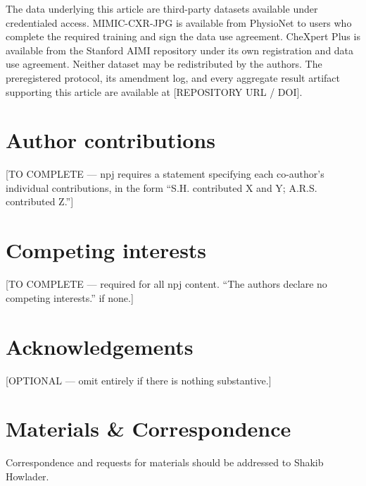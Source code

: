 \documentclass[11pt,a4paper]{article}
\begin{document}
The data underlying this article are third-party datasets available under
credentialed access. MIMIC-CXR-JPG is available from PhysioNet to users who
complete the required training and sign the data use agreement. CheXpert Plus
is available from the Stanford AIMI repository under its own registration and
data use agreement. Neither dataset may be redistributed by the authors. The
preregistered protocol, its amendment log, and every aggregate result artifact
supporting this article are available at [REPOSITORY URL / DOI].

\section*{Author contributions}
[TO COMPLETE --- npj requires a statement specifying each co-author's
individual contributions, in the form ``S.H. contributed X and Y; A.R.S.
contributed Z.'']

\section*{Competing interests}
[TO COMPLETE --- required for all npj content. ``The authors declare no
competing interests.'' if none.]

\section*{Acknowledgements}
[OPTIONAL --- omit entirely if there is nothing substantive.]

\section*{Materials \& Correspondence}
Correspondence and requests for materials should be addressed to Shakib
Howlader.

\clearpage


\end{document}
